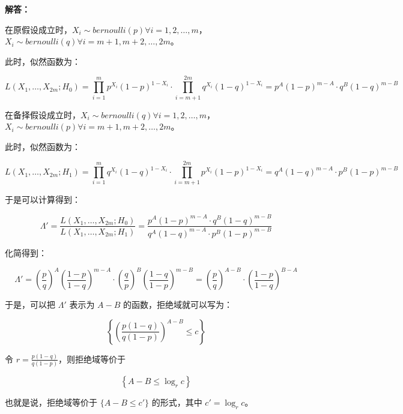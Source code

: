 \documentclass[12pt,a4paper]{article}
\begin{document}
\begin{answerbox}
\textbf{解答：}

在原假设成立时，$X_i \sim bernoulli(p) \forall i=1,2,\ldots,m$，$X_i \sim bernoulli(q) \forall i=m+1,m+2,\ldots,2m$。

此时，似然函数为：

$$
L(X_1, \ldots, X_{2m}; H_0) = \prod_{i=1}^m p^{X_i} (1-p)^{1-X_i} \cdot \prod_{i=m+1}^{2m} q^{X_i} (1-q)^{1-X_i} = p^A (1-p)^{m-A} \cdot q^B (1-q)^{m-B}
$$

在备择假设成立时，$X_i \sim bernoulli(q) \forall i=1,2,\ldots,m$，$X_i \sim bernoulli(p) \forall i=m+1,m+2,\ldots,2m$。

此时，似然函数为：

$$
L(X_1, \ldots, X_{2m}; H_1) = \prod_{i=1}^m q^{X_i} (1-q)^{1-X_i} \cdot \prod_{i=m+1}^{2m} p^{X_i} (1-p)^{1-X_i} = q^A (1-q)^{m-A} \cdot p^B (1-p)^{m-B}
$$

于是可以计算得到：

$$
\Lambda' = \frac{L(X_1, \ldots, X_{2m}; H_0)}{L(X_1, \ldots, X_{2m}; H_1)} = \frac{p^A (1-p)^{m-A} \cdot q^B (1-q)^{m-B}}{q^A (1-q)^{m-A} \cdot p^B (1-p)^{m-B}} 
$$

化简得到：

$$
\Lambda' = \left(\frac{p}{q}\right)^A \left(\frac{1-p}{1-q}\right)^{m-A} \cdot \left(\frac{q}{p}\right)^B \left(\frac{1-q}{1-p}\right)^{m-B} = \left(\frac{p}{q}\right)^{A-B} \cdot \left(\frac{1-p}{1-q}\right)^{B-A} 
$$

于是，可以把 $\Lambda'$ 表示为 $A-B$ 的函数，拒绝域就可以写为：

$$
\left\{\left(\frac{p(1-q)}{q(1-p)}\right)^{A-B} \leq c\right\}
$$

令 $r = \frac{p(1-q)}{q(1-p)}$，则拒绝域等价于

$$
\left\{A-B \leq \log_r c\right\}
$$

也就是说，拒绝域等价于 $\{A-B \leq c'\}$ 的形式，其中 $c' = \log_r c$。
\end{answerbox}
\end{document}
